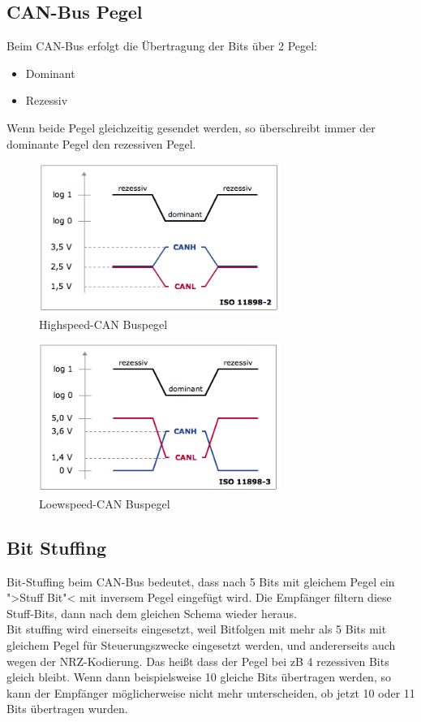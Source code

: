 \clearpage
\subsection{CAN-Bus Pegel} Beim CAN-Bus erfolgt die Übertragung der
Bits über 2 Pegel: 
\begin{itemize} 
\item Dominant 
\item Rezessiv
\end{itemize}

Wenn beide Pegel gleichzeitig gesendet werden, so überschreibt immer
der dominante Pegel den rezessiven Pegel.

\begin{figure}[h] 
\centering
\includegraphics[width=0.7\textwidth]{figures/highcan}
\caption{Highspeed-CAN Buspegel \citep{VEC}} 
\label{data}
\end{figure} 

\begin{figure}[h] 
\centering
\includegraphics[width=0.7\textwidth]{figures/lowcan}
\caption{Loewspeed-CAN Buspegel \citep{VEC}} 
\label{data}
\end{figure} 
	
\subsection{Bit Stuffing}
\label{sec:bitstuffing} 
Bit-Stuffing beim CAN-Bus bedeutet, dass
nach 5 Bits mit gleichem Pegel ein ">Stuff Bit"< mit inversem Pegel
eingefügt wird. Die Empfänger filtern diese Stuff-Bits, dann nach dem
gleichen Schema wieder heraus.
\\ Bit stuffing wird einerseits
eingesetzt, weil Bitfolgen mit mehr als 5 Bits mit gleichem Pegel für
Steuerungszwecke eingesetzt werden, und andererseits auch wegen der
NRZ-Kodierung. Das heißt dass der Pegel bei zB 4 rezessiven Bits
gleich bleibt. Wenn dann beispielsweise 10 gleiche Bits übertragen
werden, so kann der Empfänger möglicherweise nicht mehr unterscheiden,
ob jetzt 10 oder 11 Bits übertragen wurden.
	
